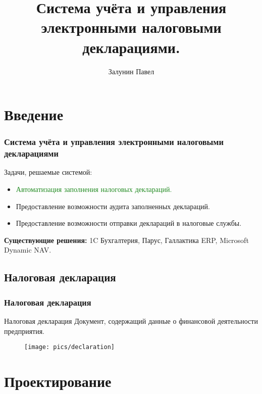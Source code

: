 \documentclass[xcolor=pdftex, dvipsnames, table]{beamer}
\title{Система учёта и управления электронными налоговыми декларациями.}
\author{Залунин Павел}
\institute {
  БГУИР\\
  ФИТУ
}
\begin{document}
\frame{\titlepage}

\section{Введение}
\begin{frame}
  \frametitle{Система учёта и управления электронными налоговыми декларациями}
  Задачи, решаемые системой:
  \begin{itemize}
    \item \begin{Large}\textcolor{ForestGreen}{Автоматизация заполнения налоговых деклараций.}\end{Large}
    \item Предоставление возможности аудита заполненных деклараций.
    \item Предоставление возможности отправки деклараций в налоговые службы.
  \end{itemize}

  \vspace{3cm}
  \textbf{Существующие решения:} 1C Бухгалтерия, Парус, Галлактика ERP, Microsoft Dynamic NAV.
\end{frame}

\subsection{Налоговая декларация}
\begin{frame}
  \frametitle{Налоговая декларация}
  \begin{block}{Налоговая декларация}
    Документ, содержащий данные о финансовой деятельности предприятия.
  \end{block}

  \begin{figure}
    \begin{center}
      \texttt{[image: pics/declaration]}
    \end{center}
  \end{figure}
\end{frame}

\section{Проектирование}
\end{document}
